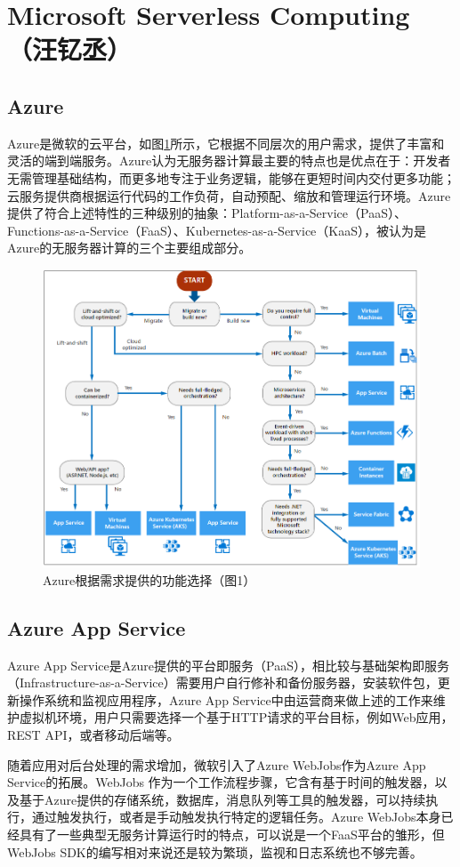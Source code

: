 \section{Microsoft Serverless Computing（汪钇丞）}\label{sec:microsoft}
\subsection{Azure}
Azure是微软的云平台，如图\ref{figs:Overview}所示，它根据不同层次的用户需求，提供了丰富和灵活的端到端服务\cite{overview}。Azure认为无服务器计算最主要的特点也是优点在于：开发者无需管理基础结构，而更多地专注于业务逻辑，能够在更短时间内交付更多功能；云服务提供商根据运行代码的工作负荷，自动预配、缩放和管理运行环境。Azure提供了符合上述特性的三种级别的抽象：Platform-as-a-Service（PaaS）、Functions-as-a-Service（FaaS）、Kubernetes-as-a-Service（KaaS），被认为是Azure的无服务器计算的三个主要组成部分。
\begin{figure}[!htbp]
	\centering
	\includegraphics[width=0.7\linewidth]{figs/AzureChoice.PNG}
	\caption{Azure根据需求提供的功能选择（\cite{overview}图1）}
	\label{figs:Overview}
\end{figure}

\subsection{Azure App Service}
Azure App Service是Azure提供的平台即服务（PaaS），相比较与基础架构即服务（Infrastructure-as-a-Service）需要用户自行修补和备份服务器，安装软件包，更新操作系统和监视应用程序，Azure App Service中由运营商来做上述的工作来维护虚拟机环境，用户只需要选择一个基于HTTP请求的平台目标，例如Web应用，REST API，或者移动后端等。

随着应用对后台处理的需求增加，微软引入了Azure WebJobs作为Azure App Service的拓展。WebJobs 作为一个工作流程步骤，它含有基于时间的触发器，以及基于Azure提供的存储系统，数据库，消息队列等工具的触发器，可以持续执行，通过触发执行，或者是手动触发执行特定的逻辑任务。Azure WebJobs本身已经具有了一些典型无服务计算运行时的特点，可以说是一个FaaS平台的雏形，但WebJobs SDK的编写相对来说还是较为繁琐，监视和日志系统也不够完善。

